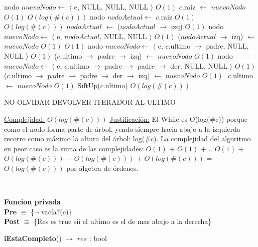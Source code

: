 \begin{Algoritmos}
\begin{algorithmic}[1]
        \State nodo $nuevoNodo \gets$ $\langle$ e, NULL, NULL, NULL $\rangle$   \Comment $O(1)$
        \State $c$.raiz $\gets$ $nuevoNodo$ \Comment $O(1)$
    \Else
          \Comment $O(log(\#(c)))$
            \State nodo $nodoActual \gets$ $c$.raiz \Comment $O(1)$
              \Comment $O(log(\#(c)))$
                \State $nodoActual$ $\gets$ ($nodoActual$ $\to$ izq)  \Comment $O(1)$
            \EndWhile
            \State nodo $nuevoNodo \gets$ $\langle$ e, $nodoActual$, NULL, NULL $\rangle$   \Comment $O(1)$
            \State ($nodoActual$ $\to$ izq) $\gets$ $nuevoNodo$ \Comment $O(1)$
        \Else
              \Comment $O(1)$
                \State nodo $nuevoNodo \gets$ $\langle$ e, $c$.ultimo $\to$ padre, NULL, NULL $\rangle$   \Comment $O(1)$
                \State ($c$.ultimo $\to$ padre $\to$ izq) $\gets$ $nuevoNodo$ \Comment $O(1)$
            \Else %
                \State nodo $nuevoNodo \gets$ $\langle$ e, $c$.ultimo $\to$ padre $\to$ padre $\to$ der, NULL, NULL $\rangle$   \Comment $O(1)$
                \State ($c$.ultimo $\to$ padre $\to$ padre $\to$ der $\to$ izq) $\gets$ $nuevoNodo$ \Comment $O(1)$
            \EndIf
        \EndIf
    \EndIf
    \State $ $
    \State $c$.ultimo $\gets$ $nuevoNodo$ \Comment $O(1)$
    \State SiftUp($c$.ultimo) \Comment $O(log(\#(c)))$

    NO OLVIDAR DEVOLVER ITERADOR AL ULTIMO

    \medskip
    \Statex \underline{Complejidad:} $O(log(\#(c)))$
    \Statex \underline{Justificaci\'on:} El While es O(log($\#$c)) porque como el nodo forma parte de \'arbol, yendo siempre hacia abajo a la izquierda recorro como m\'aximo la altura del \'arbol: log($\#$c). La complejidad del algoritmo en peor caso es la suma de las complejidades: $O(1)$ + $O(1)$ + .. $O(1)$ + $O(log(\#(c)))$ + $O(log(\#(c)))$ + $O(log(\#(c)))$ = $O(log(\#(c)))$ por \'algebra de \'ordenes.
\end{algorithmic}






$ $\newline
$ $\newline

\textbf{Funcion privada}\\
\textbf{Pre} $\equiv$ \{$\neg$ vac\'ia?($c$)\}\\%
\textbf{Post} $\equiv$ \{Res es true sii el ultimo es el de mas abajo a la derecha\}%
\begin{algorithm}[H]
{\textbf{iEstaCompleto}() $\to$ $res$ : bool}
\begin{algorithmic}[1]


\end{algorithmic}
\end{algorithm}
\end{Algoritmos}
